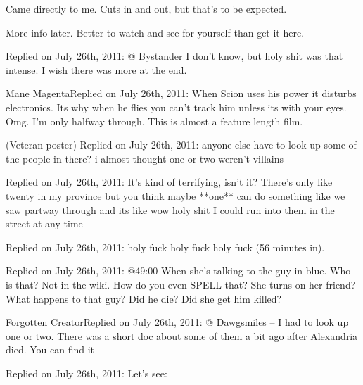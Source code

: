 Came directly to me.  Cuts in and out, but that's to be expected.



More info later.  Better to watch and see for yourself than get it here.






\blacktriangleright  {}
Replied on July 26th, 2011:
@ Bystander
I don't know, but holy shit was that intense.  I wish there was more at the end.



\blacktriangleright  Mane MagentaReplied on July 26th, 2011:
When Scion uses his power it disturbs electronics.  Its why when he flies you can't track him unless its with your eyes.
Omg.  I'm only halfway through.  This is almost a feature length film.



\blacktriangleright  {} (Veteran poster)
Replied on July 26th, 2011:
anyone else have to look up some of the people in there?  i almost thought one or two weren't villains



\blacktriangleright  {}
Replied on July 26th, 2011:
It's kind of terrifying, isn't it?  There's only like twenty in my province but you think maybe **one** can do something like we saw partway through and its like wow holy shit I could run into them in the street at any time



\blacktriangleright  {}
Replied on July 26th, 2011:
holy fuck holy fuck holy fuck
(56 minutes in).



\blacktriangleright  {}
Replied on July 26th, 2011:
@49:00 When she's talking to the guy in blue.  Who is that?  Not in the wiki.  How do you even SPELL that?  She turns on her friend?  What happens to that guy?  Did he die?  Did she get him killed?



\blacktriangleright  Forgotten CreatorReplied on July 26th, 2011:
@ Dawgsmiles – I had to look up one or two.  There was a short doc about some of them a bit ago after Alexandria died.  You can find it \underline{}



\blacktriangleright {}Replied on July 26th, 2011:
Let's see:



